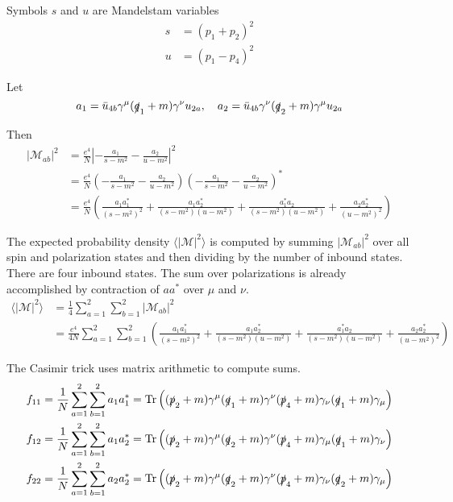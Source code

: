 \documentclass[12pt]{article}
\begin{document}
Symbols $s$ and $u$ are Mandelstam variables
\begin{align*}
s&=(p_1+p_2)^2
\\
u&=(p_1-p_4)^2
\end{align*}

Let
\begin{equation*}
a_1=\bar{u}_{4b}\gamma^\mu(\slashed{q}_1+m)\gamma^\nu u_{2a},
\quad
a_2=\bar{u}_{4b}\gamma^\nu(\slashed{q}_2+m)\gamma^\mu u_{2a}
\end{equation*}

Then
\begin{align*}
|\mathcal{M}_{ab}|^2&=\frac{e^4}{N}\left|-\frac{a_1}{s-m^2}-\frac{a_2}{u-m^2}\right|^2\\
&=
\frac{e^4}{N}
\left(-\frac{a_1}{s-m^2}-\frac{a_2}{u-m^2}\right)
\left(-\frac{a_1}{s-m^2}-\frac{a_2}{u-m^2}\right)^*\\
&=
\frac{e^4}{N}\left(
\frac{a_1a_1^*}{(s-m^2)^2}
+\frac{a_1a_2^*}{(s-m^2)(u-m^2)}
+\frac{a_1^*a_2}{(s-m^2)(u-m^2)}
+\frac{a_2a_2^*}{(u-m^2)^2}
\right)
\end{align*}

The expected probability density $\langle|\mathcal{M}|^2\rangle$ is
computed by summing $|\mathcal{M}_{ab}|^2$ over all spin and polarization states
and then dividing by the number of inbound states.
There are four inbound states.
The sum over polarizations is already accomplished by contraction of $aa^*$ over $\mu$ and $\nu$.
\begin{align*}
\langle|\mathcal{M}|^2\rangle
&=\frac{1}{4}\sum_{a=1}^2\sum_{b=1}^2|\mathcal{M}_{ab}|^2
\\
&=\frac{e^4}{4N}\sum_{a=1}^2\sum_{b=1}^2
\left(
\frac{a_1a_1^*}{(s-m^2)^2}
+\frac{a_1a_2^*}{(s-m^2)(u-m^2)}
+\frac{a_1^*a_2}{(s-m^2)(u-m^2)}
+\frac{a_2a_2^*}{(u-m^2)^2}
\right)
\end{align*}

The Casimir trick uses matrix arithmetic to compute sums.
\begin{align*}
f_{11}&=\frac{1}{N} \sum_{a=1}^2\sum_{b=1}^2 a_1a_1^*=\mathop{\rm Tr}
\left(
(\slashed{p}_2+m)\gamma^\mu(\slashed{q}_1+m)\gamma^\nu(\slashed{p}_4+m)\gamma_\nu(\slashed{q}_1+m)\gamma_\mu
\right)
\\
f_{12}&=\frac{1}{N} \sum_{a=1}^2\sum_{b=1}^2 a_1a_2^*=\mathop{\rm Tr}
\left(
(\slashed{p}_2+m)\gamma^\mu(\slashed{q}_2+m)\gamma^\nu(\slashed{p}_4+m)\gamma_\mu(\slashed{q}_1+m)\gamma_\nu
\right)
\\
f_{22}&=\frac{1}{N} \sum_{a=1}^2\sum_{b=1}^2 a_2a_2^*=\mathop{\rm Tr}
\left(
(\slashed{p}_2+m)\gamma^\mu(\slashed{q}_2+m)\gamma^\nu(\slashed{p}_4+m)\gamma_\nu(\slashed{q}_2+m)\gamma_\mu
\right)
\end{align*}
\end{document}
